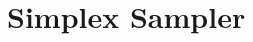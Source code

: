 \documentclass[main.tex]{subfiles}
\begin{document}
\newpage
\setcounter{section}{2}

\section{Simplex Sampler}

\begin{comment}
\begin{enumerate}
\item {\tt fakemodel.cc}: 
The fakemodel.cc is a template used to represent a potential model. It will be replaced by the actual model created by the user. 

\item {\tt smoothy\_writecoefficients.cc}:
This cc files read in the parameter files and reads in the training point info from the simplex and tune the function Y values and generate the coefficient for each observable and make a directory of the possible coefficient values 

\item {\tt smoothy\_readcoefficients.cc}: 
This cc file reads in the coefficient files and reads in the training info from the simplex and tests the samples from the emulator at the training points. 
\end{enumerate}

\subsection{Software Directory}

The {\tt ../githome\_msu/smooth/software} directory file contains all the header and source files used to calculate the libraries for the main functionality of the emulator. Should the User wish to see the header files, they are in {\tt ../githome\_msu/smooth/software/include/msu\_smooth/}. The source files are in {\tt ../githome\_msu/smooth/software/src/}, but are not written or organized in a way that makes it particulary easy for an outsider to modify. If one needs to recompile the libraries, one can enter {\tt ../githome\_msu/smooth/software/} and rerun {\tt cmake .} followed by {\tt make}. 

\newpage

\subsection{Project Directory}
The project directory is where the emulator works. There are files in this directory: 

1. Info Directory 


\end{comment}
\end{document}
